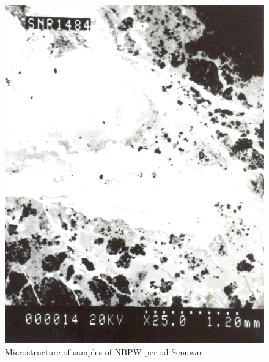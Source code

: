 
\begin{figure}[H]
\renewcommand{\thefigure}{25B}
\includegraphics[scale=0.65]{images/chapter-4/fig025B.jpg}
\caption{Microstructure of samples of NBPW period Senuwar}\label{chapter-4-fig25B}
\end{figure}

\newpage

